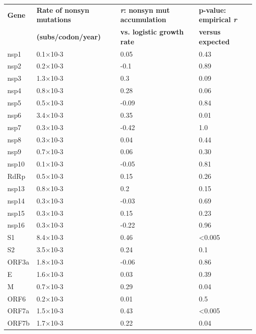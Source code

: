 \documentclass[12pt, letterpaper]{article}
\begin{document}
\begin{table}[]
    \scriptsize
    \begin{center}
    \begin{tabular}{@{}llll@{}}
    \toprule
    \textbf{Gene} & \textbf{Rate of nonsyn mutations} & \textbf{\emph{r}: nonsyn mut accumulation } & \textbf{p-value: empirical \emph{r}} \\  & \textbf{(subs/codon/year)} & \textbf{vs. logistic growth rate} & \textbf{versus expected} \\ \midrule
    nsp1  & 0.1×10-3  & 0.05  & 0.43             \\
    nsp2  & 0.2×10-3  & -0.1  & 0.89             \\
    nsp3  & 1.3×10-3  & 0.3   & 0.09             \\
    nsp4  & 0.8×10-3  & 0.28  & 0.06             \\
    nsp5  & 0.5×10-3  & -0.09 & 0.84             \\
    nsp6  & 3.4×10-3  & 0.35  & 0.01             \\
    nsp7  & 0.3×10-3  & -0.42 & 1.0                \\
    nsp8  & 0.3×10-3  & 0.04  & 0.44             \\
    nsp9  & 0.7×10-3  & 0.06  & 0.30              \\
    nsp10 & 0.1×10-3  & -0.05 & 0.81             \\
    RdRp  & 0.5×10-3  & 0.15  & 0.26             \\
    nsp13 & 0.8×10-3  & 0.2   & 0.15             \\
    nsp14 & 0.3×10-3  & -0.03 & 0.69              \\
    nsp15 & 0.3×10-3  & 0.15  & 0.23             \\
    nsp16 & 0.3×10-3  & -0.22 & 0.96             \\
    S1    & 8.4×10-3  & 0.46  & \textless{}0.005 \\
    S2    & 3.5×10-3  & 0.24  & 0.1              \\
    ORF3a & 1.8×10-3  & -0.06 & 0.86             \\
    E     & 1.6×10-3  & 0.03  & 0.39             \\
    M     & 0.7×10-3  & 0.29  & 0.04             \\
    ORF6  & 0.2×10-3  & 0.01  & 0.5              \\
    ORF7a & 1.5×10-3  & 0.43  & \textless{}0.005 \\
    ORF7b & 1.7×10-3  & 0.22  & 0.04             \\

\end{tabular}
\end{center}
\end{table}
\end{document}
